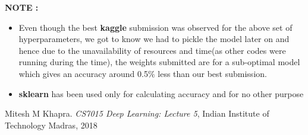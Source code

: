 \documentclass[12pt]{report}
\begin{document}
 \textbf{NOTE : }\\
 \begin{itemize}
     \item Even though the best \textbf{kaggle} submission was observed for the above set of hyperparameters, we got to know we had to pickle the model later on and hence due to the unavailability of resources and time(as other codes were running during the time), the weights submitted are for a sub-optimal model which gives an accuracy around 0.5$\%$ less than our best submission.
     \item \textbf{sklearn} has been used only for calculating accuracy and for no other purpose
 \end{itemize}

\begin{thebibliography}{9}
Mitesh M Khapra. \textit{CS7015 Deep Learning: Lecture 5}, 
Indian Institute of Technology Madras, 2018
\end{thebibliography}
\end{document}

